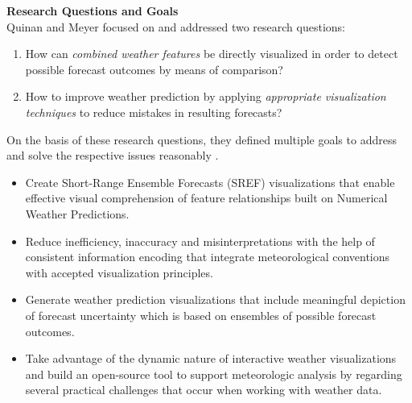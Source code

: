 \documentclass[citeauthoryear]{llncs}
\begin{document}
\textbf{Research Questions and Goals}\ \\[0.2cm]
Quinan and Meyer focused on and addressed two research questions:
\begin{enumerate}
\item How can \textit{combined weather features} be directly visualized in order to detect possible forecast outcomes by means of comparison?
\item How to improve weather prediction by applying \textit{appropriate visualization techniques} to reduce mistakes in resulting forecasts?
\end{enumerate}
On the basis of these research questions, they defined multiple goals to address and solve the respective issues reasonably \cite{quinan2016visually}. 
\begin{itemize}[label=$\bullet$]
\item Create Short-Range Ensemble Forecasts (SREF) visualizations that enable effective visual comprehension of feature relationships built on Numerical Weather Predictions.
\item Reduce inefficiency, inaccuracy and misinterpretations with the help of consistent information encoding that integrate meteorological conventions with accepted visualization principles.
\item Generate weather prediction visualizations that include meaningful depiction of forecast uncertainty which is based on ensembles of possible forecast outcomes.
\item Take advantage of the dynamic nature of interactive weather visualizations and build an open-source tool to support meteorologic analysis by regarding several practical challenges that occur when working with weather data.
\end{itemize}
\end{document}
